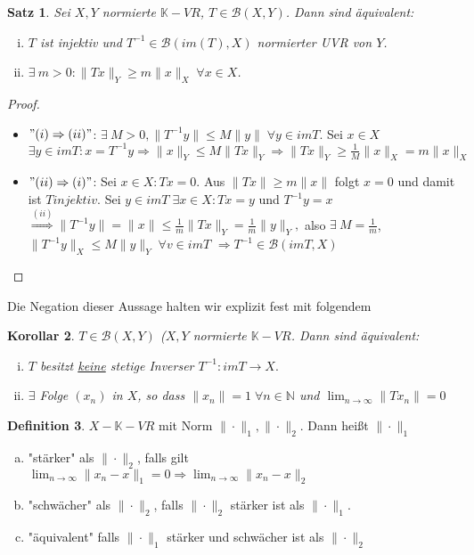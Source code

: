 \documentclass[ngerman]{report}
\theoremstyle{plain}%
\newtheorem{thm}{Satz}[chapter]
\newtheorem{cor}[thm]{Korollar}
\theoremstyle{definition}%
\newtheorem{definition}[thm]{Definition}
\theoremstyle{myStyle}
\newcommand{\N}{\mathbb{N}}
\newcommand{\K}{\mathbb{K}}
\newcommand{\B}{\mathcal{B}} %
\newcommand{\BS}[1][X,Y]{\mathcal{B}(#1)} %
\newcommand{\norm}[1]{\|#1\|}
\newcommand{\df}[1][]{%
	\overset{#1}{\Rightarrow}
}
\newcommand{\limes}[1][\infty]{\lim_{n \to #1}}
\newcommand{\inv}[1]{#1^{-1}}
\newcommand{\disp}{\displaystyle}
\newcommand{\qmarks}[1]{"{}#1"{}}
\begin{document}
	\begin{thm}
		Sei $X,Y$ normierte $\K-VR$, $T\in \BS$. Dann sind äquivalent:
			\begin{enumerate}[(i)]
				\item $T$ ist injektiv und $\inv{T} \in\B(im(T), X)$ normierter UVR von $Y$.
				\item $\exists \: m > 0: \norm{Tx}_Y \geq m\norm{x}_X \; \forall x\in X$.
			\end{enumerate}
	\end{thm}
	\begin{proof}
		\begin{itemize}[]
			\item $"(i)\df (ii)"$: $\exists \: M>0, \norm{\inv{T}y} \leq M\norm{y} \; \forall y\in imT.$
				Sei $x\in X$ $\exists y\in imT: x = \inv{T}y \df \norm{x}_Y \leq M \norm{Tx}_Y 
				\df \norm{Tx}_Y \geq \frac{1}{M} \norm{x}_X = m\norm{x}_X$
			\item $"(ii) \df (i)"$: Sei $x\in X: Tx = 0$.
				Aus $\norm{Tx} \geq m \norm{x}$ folgt $x = 0$ und damit ist $T injektiv$.
				Sei $y\in imT \; \exists x\in X: Tx = y$ und $\inv{T}y = x $
				$\df[(ii)] \norm{\inv{T}y} = \norm{x} \leq \frac{1}{m} \norm{Tx}_Y = \frac{1}{m} \norm{y}_Y,$
				also $\exists\: M = \frac{1}{m}$, $\norm{\inv{T}y}_X \leq M\norm{y}_Y \; \forall v\in imT$
				$\df \inv{T} \in \B(imT,X)$
		\end{itemize}
	\end{proof}
Die Negation dieser Aussage halten wir explizit fest mit folgendem 
	\begin{cor}
		$T \in \BS$ ($X,Y$ normierte $\K-VR$. Dann sind äquivalent:
			\begin{enumerate}[(i)]
				\item $T$ besitzt \underline{keine} stetige Inverser 
					$\inv{T} : imT\to X.$
				\item $\exists$ Folge $(x_n)$ in $X$, so dass $\norm{x_n} = 1 \; \forall n\in \N$
					und $\disp \limes \norm{T x_n} = 0$
			\end{enumerate}
	\end{cor}

	\begin{definition}
		$X-\K-VR$ mit Norm $\norm{\cdot}_1,\norm{\cdot}_2$. Dann heißt $\norm{\cdot}_1$ 
			\begin{enumerate}[(a)]
				\item \qmarks{stärker} als $\norm{\cdot}_2$, falls gilt
					$\disp \limes \norm{x_n - x}_1 = 0 \df \limes \norm{x_n - x}_2$
				\item \qmarks{schwächer} als $\norm{\cdot}_2$, falls $\norm{\cdot}_2$ stärker ist als $\norm{\cdot}_1$.
				\item \qmarks{äquivalent} falls $\norm{\cdot}_1$ stärker und schwächer ist als $\norm{\cdot}_2$
			\end{enumerate}
	\end{definition}
\end{document}
